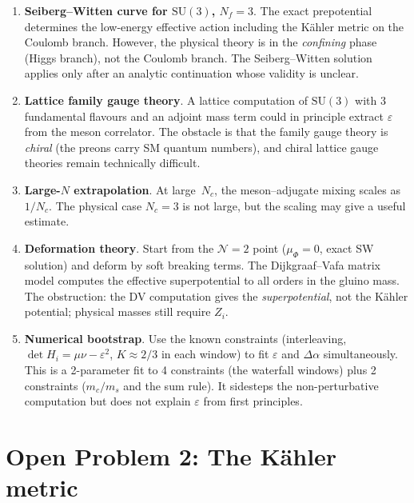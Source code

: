 \documentclass[12pt,a4paper]{article}
\newcommand{\SU}{\mathrm{SU}}
\begin{document}
\begin{enumerate}[label=(\alph*)]
\item \textbf{Seiberg--Witten curve for $\SU(3)$, $N_f = 3$}.
  The exact prepotential determines the low-energy effective action
  including the K\"ahler metric on the Coulomb branch.  However,
  the physical theory is in the \emph{confining} phase (Higgs branch),
  not the Coulomb branch.  The Seiberg--Witten solution applies
  only after an analytic continuation whose validity is unclear.

\item \textbf{Lattice family gauge theory}.  A lattice computation of
  $\SU(3)$ with 3 fundamental flavours and an adjoint mass term could
  in principle extract $\varepsilon$ from the meson correlator.
  The obstacle is that the family gauge theory is \emph{chiral}
  (the preons carry SM quantum numbers), and chiral lattice gauge
  theories remain technically difficult.

\item \textbf{Large-$N$ extrapolation}.  At large~$N_c$, the
  meson--adjugate mixing scales as $1/N_c$.  The physical case
  $N_c = 3$ is not large, but the scaling may give a useful
  estimate.

\item \textbf{Deformation theory}.  Start from the $\mathcal{N}{=}2$
  point ($\mu_\Phi = 0$, exact SW solution) and deform by soft
  breaking terms.  The Dijkgraaf--Vafa matrix model
  computes the effective superpotential to all orders in the
  gluino mass.  The obstruction: the DV computation gives the
  \emph{superpotential}, not the K\"ahler potential; physical masses
  still require $Z_i$.

\item \textbf{Numerical bootstrap}.  Use the known constraints
  (interleaving, $\det H_i = \mu\nu - \varepsilon^2$,
  $K \approx 2/3$ in each window) to fit $\varepsilon$ and
  $\Delta\alpha$ simultaneously.  This is a 2-parameter fit to
  4 constraints (the waterfall windows) plus 2 constraints
  ($m_c/m_s$ and the sum rule).  It sidesteps the non-perturbative
  computation but does not explain $\varepsilon$ from first principles.
\end{enumerate}


\section{Open Problem 2: The K\"ahler metric}
\label{sec:kahler}
\end{document}
